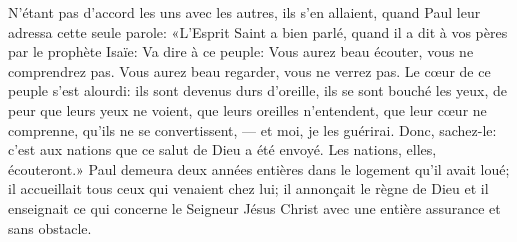 N’étant pas d’accord les uns avec les autres, ils s’en allaient,
	quand Paul leur adressa cette seule parole:
	«L’Esprit Saint a bien parlé,
	quand il a dit à vos pères par le prophète Isaïe:
	Va dire à ce peuple: Vous aurez beau écouter, vous ne comprendrez pas.
	Vous aurez beau regarder, vous ne verrez pas.
Le cœur de ce peuple s’est alourdi:
	ils sont devenus durs d’oreille, ils se sont bouché les yeux,
	de peur que leurs yeux ne voient, que leurs oreilles n’entendent,
	que leur cœur ne comprenne, qu’ils ne se convertissent,
	--- et moi, je les guérirai.
Donc, sachez-le: c’est aux nations que ce salut de Dieu a été envoyé.
	Les nations, elles, écouteront.»
Paul demeura deux années entières dans le logement qu’il avait loué;
	il accueillait tous ceux qui venaient chez lui;
	il annonçait le règne de Dieu
	et il enseignait ce qui concerne le Seigneur Jésus Christ
	avec une entière assurance et sans obstacle.
